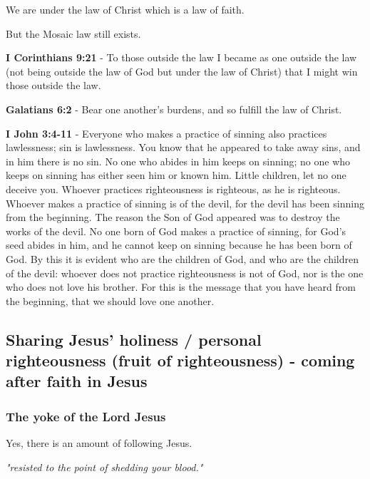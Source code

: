 \documentclass[11pt]{article}
\begin{document}
We are under the law of Christ which is a law of faith.

But the Mosaic law still exists.

\textbf{I Corinthians 9:21} - To those outside the law I became as one outside the law (not being outside the law of God but under the law of Christ) that I might win those outside the law.

\textbf{Galatians 6:2} - Bear one another's burdens, and so fulfill the law of Christ.

\textbf{I John 3:4-11} - Everyone who makes a practice of sinning also practices lawlessness; sin is lawlessness. You know that he appeared to take away sins, and in him there is no sin. No one who abides in him keeps on sinning; no one who keeps on sinning has either seen him or known him. Little children, let no one deceive you. Whoever practices righteousness is righteous, as he is righteous. Whoever makes a practice of sinning is of the devil, for the devil has been sinning from the beginning. The reason the Son of God appeared was to destroy the works of the devil. No one born of God makes a practice of sinning, for God's seed abides in him, and he cannot keep on sinning because he has been born of God. By this it is evident who are the children of God, and who are the children of the devil: whoever does not practice righteousness is not of God, nor is the one who does not love his brother. For this is the message that you have heard from the beginning, that we should love one another.

\subsection{Sharing Jesus' holiness / personal righteousness (fruit of righteousness) - coming \textbf{after} faith in Jesus}
\label{sec:org9bd5782}
\subsubsection{The yoke of the Lord Jesus}
\label{sec:org5c5030d}
Yes, there is an amount of following Jesus.

\emph{"resisted to the point of shedding your blood."}
\end{document}

